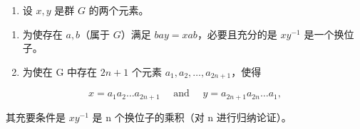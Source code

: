 \begin{enumerate}
\def\labelenumi{\arabic{enumi}。}
\setcounter{enumi}{40}
\tightlist
\item
  设 \(x, y\) 是群 \(G\) 的两个元素。
\end{enumerate}

\begin{enumerate}
\def\labelenumi{(\alph{enumi})}
\item
  为使存在 \(a, b\)（属于 \(G\)）满足 \(bay = xab\)，必要且充分的是 \(xy^{-1}\) 是一个换位子。
\item
  为使在 G 中存在 \(2n + 1\) 个元素 \(a_1, a_2, \ldots, a_{2n+1}\)，使得
\end{enumerate}

\[
x = a _ {1} a _ {2} \dots a _ {2 n + 1} \quad \text { and } \quad y = a _ {2 n + 1} a _ {2 n} \dots a _ {1},
\]

其充要条件是 \(xy^{-1}\) 是 n 个换位子的乘积（对 n 进行归纳论证）。
\relax{}
